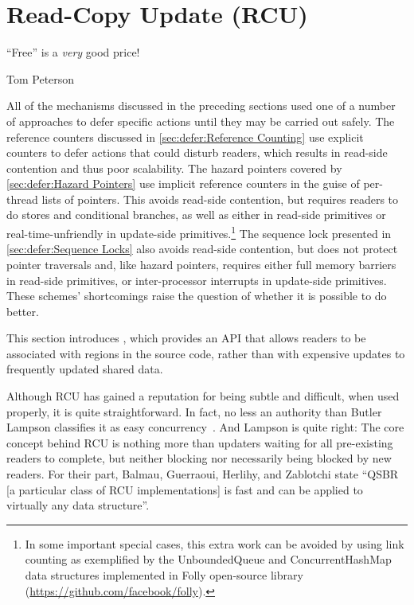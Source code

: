 
\section{Read-Copy Update (RCU)}
\label{sec:defer:Read-Copy Update (RCU)}
%
\epigraph{``Free'' is a \emph{very} good price!}{Tom Peterson}

All of the mechanisms discussed in the preceding sections
used one of a number of approaches to defer specific actions
until they may be carried out safely.
The reference counters discussed in
\cref{sec:defer:Reference Counting}
use explicit counters to defer actions that could disturb readers,
which results in read-side contention and thus poor scalability.
The hazard pointers covered by
\cref{sec:defer:Hazard Pointers}
use implicit reference counters in the guise of per-thread lists of
pointers.
This avoids read-side contention, but requires readers to do stores and
conditional branches, as well as either 
in read-side primitives or real-time-unfriendly  in
update-side primitives.\footnote{
	In some important special cases, this extra work can be avoided
	by using link counting as exemplified by the UnboundedQueue
	and ConcurrentHashMap data structures implemented in Folly
	open-source library
	(\url{https://github.com/facebook/folly}).}
The sequence lock presented in
\cref{sec:defer:Sequence Locks}
also avoids read-side contention, but does not protect pointer
traversals and, like hazard pointers, requires either full memory barriers
in read-side primitives, or inter-processor interrupts in update-side
primitives.
These schemes' shortcomings raise the question of
whether it is possible to do better.

This section introduces , which provides
an API that allows readers to be associated with regions in the source code,
rather than with expensive updates to frequently updated shared data.

Although RCU has gained a reputation for being subtle and difficult,
when used properly, it is quite straightforward.
In fact, no less an authority than Butler Lampson classifies it as easy
concurrency~\cite{ButlerLampson2022ProgrammingConcurrentSystems}.
And Lampson is quite right:
The core concept behind RCU is nothing more than updaters waiting for
all pre-existing readers to complete, but neither blocking nor necessarily
being blocked by new readers.
For their part, Balmau, Guerraoui, Herlihy, and Zablotchi state
``QSBR [a particular class of RCU implementations] is fast and can be
applied to virtually any data structure''.

